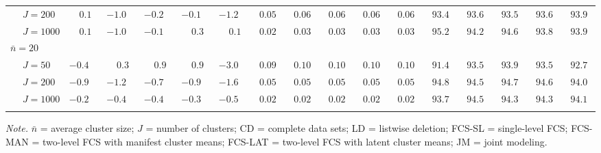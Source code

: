 \begin{sidewaystable}
\begin{threeparttable}
\begin{tabular}{llccccccccccccccc}
 & \nopagebreak $\;J=200$  & $\phantom{-}0.1\phantom{0}$ & ${-}1.0\phantom{0}$ & ${-}0.2\phantom{0}$ & ${-}0.1\phantom{0}$ & ${-}1.2\phantom{0}$ & $\phantom{0}0.05\phantom{0}$ & $\phantom{0}0.06\phantom{0}$ & $\phantom{0}0.06\phantom{0}$ & $\phantom{0}0.06\phantom{0}$ & $\phantom{0}0.06\phantom{0}$ & $\phantom{0}93.4\phantom{0}$ & $\phantom{0}93.6\phantom{0}$ & $\phantom{0}93.5\phantom{0}$ & $\phantom{0}93.6\phantom{0}$ & $\phantom{0}93.9\phantom{0}$ \\
 & \nopagebreak $\;J=1000$  & $\phantom{-}0.1\phantom{0}$ & ${-}1.0\phantom{0}$ & ${-}0.1\phantom{0}$ & $\phantom{-}0.3\phantom{0}$ & $\phantom{-}0.1\phantom{0}$ & $\phantom{0}0.02\phantom{0}$ & $\phantom{0}0.03\phantom{0}$ & $\phantom{0}0.03\phantom{0}$ & $\phantom{0}0.03\phantom{0}$ & $\phantom{0}0.03\phantom{0}$ & $\phantom{0}95.2\phantom{0}$ & $\phantom{0}94.2\phantom{0}$ & $\phantom{0}94.6\phantom{0}$ & $\phantom{0}93.8\phantom{0}$ & $\phantom{0}93.9\phantom{0}$ \\
\multicolumn{4}{l}{$\bar{n}=20$} \\  & \nopagebreak $\;J=50$  & ${-}0.4\phantom{0}$ & $\phantom{-}0.3\phantom{0}$ & $\phantom{-}0.9\phantom{0}$ & $\phantom{-}0.9\phantom{0}$ & ${-}3.0\phantom{0}$ & $\phantom{0}0.09\phantom{0}$ & $\phantom{0}0.10\phantom{0}$ & $\phantom{0}0.10\phantom{0}$ & $\phantom{0}0.10\phantom{0}$ & $\phantom{0}0.10\phantom{0}$ & $\phantom{0}91.4\phantom{0}$ & $\phantom{0}93.5\phantom{0}$ & $\phantom{0}93.9\phantom{0}$ & $\phantom{0}93.5\phantom{0}$ & $\phantom{0}92.7\phantom{0}$ \\
 & \nopagebreak $\;J=200$  & ${-}0.9\phantom{0}$ & ${-}1.2\phantom{0}$ & ${-}0.7\phantom{0}$ & ${-}0.9\phantom{0}$ & ${-}1.6\phantom{0}$ & $\phantom{0}0.05\phantom{0}$ & $\phantom{0}0.05\phantom{0}$ & $\phantom{0}0.05\phantom{0}$ & $\phantom{0}0.05\phantom{0}$ & $\phantom{0}0.05\phantom{0}$ & $\phantom{0}94.8\phantom{0}$ & $\phantom{0}94.5\phantom{0}$ & $\phantom{0}94.7\phantom{0}$ & $\phantom{0}94.6\phantom{0}$ & $\phantom{0}94.0\phantom{0}$ \\
 & \nopagebreak $\;J=1000$  & ${-}0.2\phantom{0}$ & ${-}0.4\phantom{0}$ & ${-}0.4\phantom{0}$ & ${-}0.3\phantom{0}$ & ${-}0.5\phantom{0}$ & $\phantom{0}0.02\phantom{0}$ & $\phantom{0}0.02\phantom{0}$ & $\phantom{0}0.02\phantom{0}$ & $\phantom{0}0.02\phantom{0}$ & $\phantom{0}0.02\phantom{0}$ & $\phantom{0}93.7\phantom{0}$ & $\phantom{0}94.5\phantom{0}$ & $\phantom{0}94.3\phantom{0}$ & $\phantom{0}94.3\phantom{0}$ & $\phantom{0}94.1\phantom{0}$ \\
[0.5ex]\hline\\[-1.6ex] 
\end{tabular}
\begin{tablenotes}{\footnotesize \textit{Note.} $\bar{n}$ = average cluster size; $J$ = number of clusters; CD = complete data sets; LD = listwise deletion; FCS-SL = single-level FCS; FCS-MAN = two-level FCS with manifest cluster means; FCS-LAT = two-level FCS with latent cluster means; JM = joint modeling.}\end{tablenotes}
\end{threeparttable}
\end{sidewaystable}
